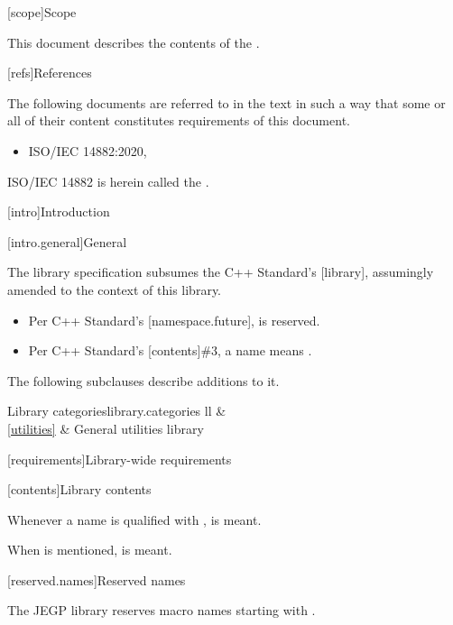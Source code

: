 [scope]{Scope}

\pnum
This document describes the contents of the .

[refs]{References}

\pnum
The following documents are referred to in the text
in such a way that some or all of their content
constitutes requirements of this document.

\begin{itemize}
\item ISO/IEC 14882:2020, 
\end{itemize}

\pnum
ISO/IEC 14882 is herein called the .

[intro]{Introduction}

[intro.general]{General}

\pnum
The library specification subsumes the C++ Standard's [library],
assumingly amended to the context of this library.
\begin{example}
\begin{itemize}
\item Per C++ Standard's [namespace.future],  is reserved.
\item Per C++ Standard's [contents]\#3, a name  means .
\end{itemize}
\end{example}
The following subclauses describe additions to it.

\begin{floattable}{Library categories}{library.categories}
{ll}
\topline
{}        &           \\ \capsep
\ref{utilities}         & General utilities library   \\
\end{floattable}

[requirements]{Library-wide requirements}

[contents]{Library contents}

\pnum
Whenever a name is qualified with ,  is meant.
\begin{example}
When  is mentioned,  is meant.
\end{example}

[reserved.names]{Reserved names}

\pnum
The JEGP library reserves macro names starting with .

